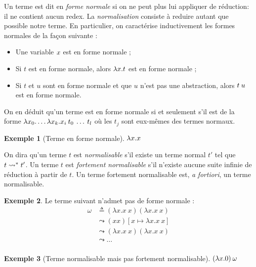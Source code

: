 \documentclass {article}
\theoremstyle{definition}
\newtheorem{example}{Exemple}
\theoremstyle{remark}
\newcommand{\todo}[1]{\textcolor{red}{#1}}
\begin{document}
\label{reduction:call_by_name}
Un terme est dit en \emph{forme
  normale} si on ne peut plus lui
appliquer de réduction: il ne contient aucun redex. La \emph{normalisation}
consiste à reduire autant que possible notre terme. En
particulier, on caractérise inductivement les formes normales de la
façon suivante :
%
\begin{itemize}
\item Une variable \(x\) est en forme normale ;
\item Si \(t\) est en forme normale, alors \(\lambda x. t\) est en
  forme normale ;
\item Si \(t\) et \(u\) sont en forme normale et que \(u\) n'est pas
  une abstraction, alors \(t\:u\) est en forme normale.
\end{itemize}

On en déduit qu'un terme est en forme normale si et seulement s'il est
de la forme
\(\lambda x_0. \ldots\lambda x_k. x_i\:t_0\:\ldots\:t_l\)
où les \(t_j\) sont eux-mêmes des termes normaux.

\begin{example}[Terme en forme normale]
  \todo{\(\lambda x. x\)}
\end{example}

On dira qu'un terme \(t\) est \emph{normalisable} s'il existe un terme
normal \(t'\) tel que \(t \leadsto^{*} t'\). Un terme \(t\) est
\emph{fortement normalisable} s'il n'existe aucune suite infinie de
réduction à partir de \(t\). Un terme fortement normalisable est,
\textit{a fortiori}, un terme normalisable.

\begin{example}
 \label{paradoxe}
  Le terme suivant n'admet pas de forme normale :
  \begin{align*}
    \omega &\triangleq (\lambda x. x\: x) (\lambda x. x\: x) \\
           &\leadsto (x x)[x \mapsto \lambda x. x\: x] \\
           &\leadsto (\lambda x. x\: x) (\lambda x. x\: x) \\
           &\leadsto \ldots \\
  \end{align*}
\end{example}

\begin{example}[Terme normalisable mais pas fortement normalisable]
  \todo{\((\lambda x. 0)\:\omega\)}
\end{example}
\end{document}
